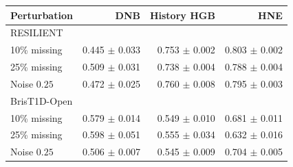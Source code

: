 \begin{tabular*}{\linewidth}{@{\extracolsep{\fill}}lrrr@{}}
\toprule
Perturbation & DNB & History HGB & HNE \\
\midrule
\multicolumn{4}{l}{RESILIENT} \\
\midrule
10\% missing & 0.445 $\pm$ 0.033 & 0.753 $\pm$ 0.002 & 0.803 $\pm$ 0.002 \\
25\% missing & 0.509 $\pm$ 0.031 & 0.738 $\pm$ 0.004 & 0.788 $\pm$ 0.004 \\
Noise $0.25$ & 0.472 $\pm$ 0.025 & 0.760 $\pm$ 0.008 & 0.795 $\pm$ 0.003 \\
\midrule
\multicolumn{4}{l}{BrisT1D-Open} \\
\midrule
10\% missing & 0.579 $\pm$ 0.014 & 0.549 $\pm$ 0.010 & 0.681 $\pm$ 0.011 \\
25\% missing & 0.598 $\pm$ 0.051 & 0.555 $\pm$ 0.034 & 0.632 $\pm$ 0.016 \\
Noise $0.25$ & 0.506 $\pm$ 0.007 & 0.545 $\pm$ 0.009 & 0.704 $\pm$ 0.005 \\
\bottomrule
\end{tabular*}